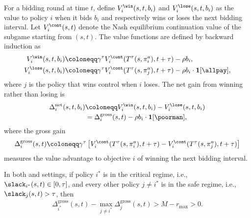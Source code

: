 For a bidding round at time \(t\), define \(V_i^{\win}(s,t,b_i)\) and \(V_i^{\lose}(s,t,b_i)\) as the value to policy \(i\) when it bids \(b_i\) and respectively wins or loses the next bidding interval.
Let \(V_i^{\cont}(s,t)\) denote the Nash equilibrium continuation value of the subgame starting from \((s,t)\).
The value functions are defined by backward induction as
\begin{align*}
  V_i^{\win}(s,t,b_i)
  &\coloneqq
  \gamma^\tau V_i^{\cont}(T^\tau(s,\pi_i^a),t+\tau)-\rho b_i,\\
  V_i^{\lose}(s,t,b_i)
  &\coloneqq
  \gamma^\tau V_i^{\cont}(T^\tau(s,\pi_j^a),t+\tau)-\rho b_i\cdot \mathbf{1}[\text{\allpay}],
\end{align*}
where \(j\) is the policy that wins control when \(i\) loses.
The net gain from winning rather than losing is
\begin{align*}
  \Delta_i^{\mathrm{net}}(s,t,b_i)
  &\coloneqq
  V_i^{\win}(s,t,b_i)-V_i^{\lose}(s,t,b_i)\\
  &=
  \Delta_i^{\mathrm{gross}}(s,t)-\rho b_i\cdot \mathbf{1}[\text{\poorman}],
\end{align*}
where the gross gain
\[
  \Delta_i^{\mathrm{gross}}(s,t)
  \coloneqq
  \gamma^\tau\left[
    V_i^{\cont}(T^\tau(s,\pi_i^a),t+\tau)
    -
    V_i^{\cont}(T^\tau(s,\pi_j^a),t+\tau)
  \right]
\]
measures the value advantage to objective \(i\) of winning the next bidding interval.

\begin{lemma}\label{lem:app-lstf-critical-regime-gap}
  In both \poorman and \allpay settings, if policy \(i^*\) is in the critical regime, i.e., \(\slack_{i^*}(s,t)\in[0,\tau]\), and every other policy \(j\neq i^*\) is in the safe regime, i.e., \(\slack_j(s,t)>\tau\), then
  \begin{align}\label{eq:app-lstf-gross-gain-urgency}
    \Delta_{i^*}^{\mathrm{gross}}(s,t)
    -
    \max_{j\neq i^*}\Delta_j^{\mathrm{gross}}(s,t)
    > M-r_{\max}>0.
  \end{align}
\end{lemma}

